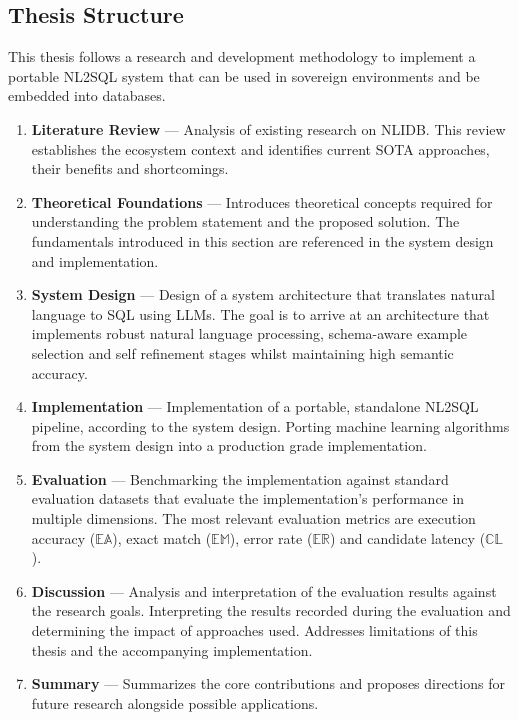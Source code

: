 \subsection{Thesis Structure}\label{section:introduction:structure}

This thesis follows a research and development methodology to implement a
portable NL2SQL system that can be used in sovereign environments and be
embedded into databases.

\begin{enumerate}
    \item \textbf{Literature Review} — Analysis of existing research on NLIDB.
        This review establishes the ecosystem context and identifies current
        SOTA approaches, their benefits and shortcomings.
    \item \textbf{Theoretical Foundations} — Introduces theoretical concepts
        required for understanding the problem statement and the
        proposed solution. The fundamentals introduced in this section are
        referenced in the system design and implementation.
    \item \textbf{System Design} — Design of a system architecture that
        translates natural language to SQL using LLMs. The goal is to arrive at
        an architecture that implements robust natural language processing,
        schema-aware example selection and self refinement stages whilst
        maintaining high semantic accuracy.
    \item \textbf{Implementation} — Implementation of a portable, standalone
        NL2SQL pipeline, according to the system design. Porting machine
        learning algorithms from the system design into a production grade
        implementation.
    \item \textbf{Evaluation} — Benchmarking the implementation against
        standard evaluation datasets that evaluate the implementation's
        performance in multiple dimensions. The most relevant evaluation
        metrics are execution accuracy ($\mathbb{EA}$), exact match
        ($\mathbb{EM}$), error rate ($\mathbb{ER}$) and candidate latency
        ($\mathbb{CL}$).
    \item \textbf{Discussion} — Analysis and interpretation of the evaluation
        results against the research goals. Interpreting the results recorded
        during the evaluation and determining the impact of approaches used.
        Addresses limitations of this thesis and the accompanying implementation.
    \item \textbf{Summary} — Summarizes the core contributions and
        proposes directions for future research alongside possible
        applications.
\end{enumerate}
